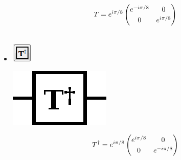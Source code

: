 \documentclass[10pt]{article}
\theoremstyle{definition}
\begin{document}
\begin{itemize}
\begin{center}
  \begin{minipage}{.9\linewidth}
    \begin{equation*} \label{mat:TGate}
    \renewcommand{\arraystretch}{1.25}
T = e^{i \pi/8}\begin{pmatrix} e^{-i\pi/8} & 0 \\ 0 & e^{i\pi/8} \end{pmatrix}
    \end{equation*}
  \end{minipage}\hspace{-2.5cm}
  \begin{minipage}{.2\linewidth}
  \vspace*{3pt}
    \begin{align}
    \end{align}
  \end{minipage}
\end{center}

\item \includegraphics{Figures/Gates/TAdjointGate.png} 

\begin{center}
\includegraphics[scale=.7]{Figures/Gates/TAdjointGateViewer} \\

\begin{minipage}{.9\linewidth}
    \begin{equation*} \label{mat:TGateAjoint}
    \renewcommand{\arraystretch}{1.25}
T^\dagger = e^{i \pi/8}\begin{pmatrix} e^{i\pi/8} & 0 \\ 0 & e^{-i\pi/8} \end{pmatrix}
    \end{equation*}
  \end{minipage}\hspace{-2.5cm}
  \begin{minipage}{.2\linewidth}
  \vspace*{3pt}
    \begin{align}
    \end{align}
  \end{minipage}


\end{center}
\end{itemize}
\end{document}
